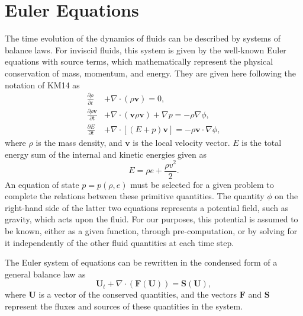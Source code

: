 \section{Euler Equations}
\label{sec:euler}

The time evolution of the dynamics of fluids can be described by systems of balance laws. For inviscid fluids, this system is given by the well-known Euler equations with source terms, which mathematically represent the physical conservation of mass, momentum, and energy. They are given here following the notation of KM14 as
\begin{subequations} \label{eq:eulerFull}
\begin{align}
\frac{\partial{\rho}}{\partial{t}} &+ \nabla \cdot (\rho \mathbf{v}) = 0, \label{eq:eulerContinuity} \\
\frac{\partial{\rho \mathbf{v}}}{\partial{t}} &+ \nabla \cdot (\mathbf{v} \rho \mathbf{v}) + \nabla p = -\rho \nabla \phi, \label{eq:eulerMomentum} \\
\frac{\partial{E}}{\partial{t}} &+ \nabla \cdot \left[(E+p)\mathbf{v}\right] = -\rho \mathbf{v} \cdot \nabla \phi, \label{eq:eulerEnergy} 
\end{align}
\end{subequations}
where $\rho$ is the mass density, and $\mathbf{v}$ is the local velocity vector. $E$ is the total energy sum of the internal and kinetic energies given as
\begin{equation} \label{eq:totalEnergy}
E=\rho e + \frac{\rho v^2}{2}.
\end{equation}
An equation of state $p=p(\rho,e)$ must be selected for a given problem to complete the relations between these primitive quantities. The quantity $\phi$ on the right-hand side of the latter two equations represents a potential field, such as gravity, which acts upon the fluid. For our purposes, this potential is assumed to be known, either as a given function, through pre-computation, or by solving for it independently of the other fluid quantities at each time step.

The Euler system of equations can be rewritten in the condensed form of a general balance law as
\begin{equation} \label{eq:euler}
\mathbf{U}_t+\nabla\cdot(\mathbf{F}(\mathbf{U}))=\mathbf{S}(\mathbf{U}),
\end{equation}
where $\mathbf{U}$ is a vector of the conserved quantities, and the vectors $\mathbf{F}$ and $\mathbf{S}$ represent the fluxes and sources of these quantities in the system.

